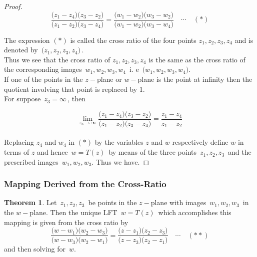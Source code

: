 \documentclass[11pt,a4paper]{article}
\theoremstyle{definition}
\newtheorem{thm}{Theorem}[section]
\begin{document}
\begin{proof}
$$\frac{\big(z_1 - z_4\big)\big(z_3 - z_2\big)}{\big(z_1 - z_2\big)\big(z_3 - z_4\big)} = \frac{\big(w_1 - w_2\big)\big(w_3 - w_2\big)}{\big(w_1 - w_2\big)\big(w_3 - w_4\big)}\quad \cdots\quad (*)$$ 



The expression $(*)$ is called the cross ratio of the four points $z_1, z_2, z_3, z_4$ and is denoted by $\,\big(z_1, z_2, z_3, z_4\big)\,$.\\
Thus we see that the cross ratio of $z_1, z_2, z_3, z_4$ is the same as the cross ratio of the corresponding images $\, w_1, w_2, w_3, w_4\,$ i. e $\, \big(w_1, w_2, w_3, w_4\big)$.\\



If one of the points in the $z-$plane or $w-$plane is the point at infinity then the quotient involving that point is replaced by 1.\\
For suppose $\, z_3 ={\infty}\,$, then 

$$\lim\limits_{z_3\rightarrow \infty} \frac{\big(z_1 - z_4\big)\big(z_3 - z_2\big)}{\big(z_1 - z_2\big)\big(z_3 - z_4\big)} = \frac{z_1 - z_4}{z_1 - z_2}$$\\

Replacing $z_4$ and $w_4$ in $(*)$ by the variables $z$ and $w$ respectively define $w$ in terms of $z$ and hence $\, w = T(z) \,$ by means of the three points $\, z_1, z_2, z_3\,$ and the prescribed images $\,w_1, w_2, w_3$. Thus we have.
\end{proof}

{\color[wave]{485}\subsubsection{Mapping Derived from the Cross-Ratio}}
\begin{thm}
Let $\,z_1, z_2, z_3\,$ be points in the $z-$plane with images $\,w_1, w_2, w_3\,$ in the $w-$plane. Then the unique LFT $\, w = T(z)\,$ which accomplishes this mapping is given from the cross ratio by 
$$\frac{\big(w - w_1\big)\big(w_2 - w_3\big)}{\big(w - w_3\big)\big(w_2 - w_1\big)} = \frac{\big(z - z_1\big)\big(z_2 - z_3\big)}{\big(z - z_3\big)\big(z_2 - z_1\big)}\quad \cdots\quad  (**)$$
and then solving for $\, w$.\\
\end{thm}
\end{document}
